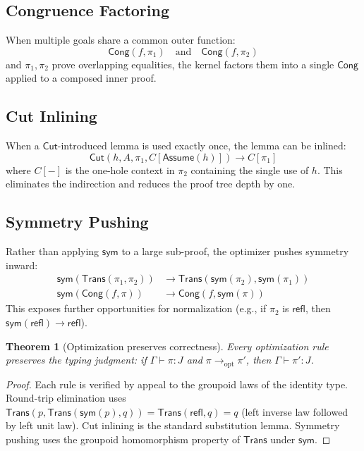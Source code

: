 \documentclass[11pt,a4paper]{report}
\theoremstyle{definition}
\theoremstyle{plain}
\newtheorem{theorem}[definition]{Theorem}
\newcommand{\Refl}{\mathsf{refl}}
\newcommand{\sym}{\mathsf{sym}}
\newcommand{\Cut}{\mathsf{Cut}}
\newcommand{\Assume}{\mathsf{Assume}}
\newcommand{\Trans}{\mathsf{Trans}}
\newcommand{\Cong}{\mathsf{Cong}}
\begin{document}
\subsection{Congruence Factoring}

When multiple goals share a common outer function:
\[
  \Cong(f, \pi_1) \quad \text{and} \quad \Cong(f, \pi_2)
\]
and $\pi_1, \pi_2$ prove overlapping equalities, the kernel factors
them into a single $\Cong$ applied to a composed inner proof.

\subsection{Cut Inlining}

When a $\Cut$-introduced lemma is used exactly once, the lemma can
be inlined:
\[
  \Cut(h, A, \pi_1, C[{\Assume(h)}])
  \longrightarrow C[\pi_1]
\]
where $C[-]$ is the one-hole context in $\pi_2$ containing the single
use of $h$. This eliminates the indirection and reduces the proof
tree depth by one.

\subsection{Symmetry Pushing}

Rather than applying $\sym$ to a large sub-proof, the optimizer pushes
symmetry inward:
\begin{align}
  \sym(\Trans(\pi_1, \pi_2)) &\longrightarrow
    \Trans(\sym(\pi_2), \sym(\pi_1)) \\
  \sym(\Cong(f, \pi)) &\longrightarrow \Cong(f, \sym(\pi))
\end{align}
This exposes further opportunities for normalization (e.g., if $\pi_2$
is $\Refl$, then $\sym(\Refl) \to \Refl$).

\begin{theorem}[Optimization preserves correctness]
Every optimization rule preserves the typing judgment: if
$\Gamma \vdash \pi : J$ and $\pi \longrightarrow_{\mathrm{opt}} \pi'$,
then $\Gamma \vdash \pi' : J$.
\end{theorem}
\begin{proof}
Each rule is verified by appeal to the groupoid laws of the identity
type. Round-trip elimination uses $\Trans(p, \Trans(\sym(p), q)) =
\Trans(\Refl, q) = q$ (left inverse law followed by left unit law).
Cut inlining is the standard substitution lemma. Symmetry pushing uses
the groupoid homomorphism property of $\Trans$ under $\sym$.
\end{proof}
\end{document}
